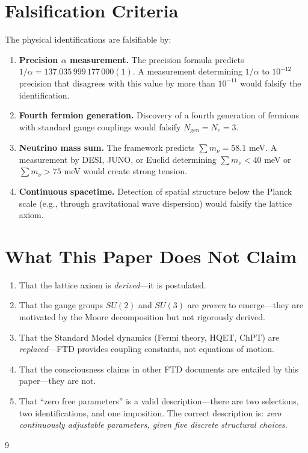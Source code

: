 \documentclass[12pt]{article}
\theoremstyle{definition}
\theoremstyle{remark}
\begin{document}
\section{Falsification Criteria}
\label{sec:falsification}

The physical identifications are falsifiable by:

\begin{enumerate}
    \item \textbf{Precision $\alpha$ measurement.} The precision formula predicts $1/\alpha = 137.035\,999\,177\,000(1)$. A measurement determining $1/\alpha$ to $10^{-12}$ precision that disagrees with this value by more than $10^{-11}$ would falsify the identification.

    \item \textbf{Fourth fermion generation.} Discovery of a fourth generation of fermions with standard gauge couplings would falsify $N_{\mathrm{gen}} = N_c = 3$.

    \item \textbf{Neutrino mass sum.} The framework predicts $\sum m_\nu = 58.1$ meV. A measurement by DESI, JUNO, or Euclid determining $\sum m_\nu < 40$ meV or $\sum m_\nu > 75$ meV would create strong tension.

    \item \textbf{Continuous spacetime.} Detection of spatial structure below the Planck scale (e.g., through gravitational wave dispersion) would falsify the lattice axiom.
\end{enumerate}

\section{What This Paper Does Not Claim}
\label{sec:does-not}

\begin{enumerate}[nosep]
    \item That the lattice axiom is \emph{derived}---it is postulated.
    \item That the gauge groups $SU(2)$ and $SU(3)$ are \emph{proven} to emerge---they are motivated by the Moore decomposition but not rigorously derived.
    \item That the Standard Model dynamics (Fermi theory, HQET, ChPT) are \emph{replaced}---FTD provides coupling constants, not equations of motion.
    \item That the consciousness claims in other FTD documents are entailed by this paper---they are not.
    \item That ``zero free parameters'' is a valid description---there are two selections, two identifications, and one imposition. The correct description is: \emph{zero continuously adjustable parameters, given five discrete structural choices.}
\end{enumerate}

\begin{thebibliography}{9}

\end{thebibliography}
\end{document}

